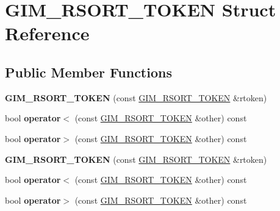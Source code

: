 \hypertarget{structGIM__RSORT__TOKEN}{}\section{G\+I\+M\+\_\+\+R\+S\+O\+R\+T\+\_\+\+T\+O\+K\+EN Struct Reference}
\label{structGIM__RSORT__TOKEN}
\subsection*{Public Member Functions}
\begin{DoxyCompactItemize}
\item 
\mbox{\label{structGIM__RSORT__TOKEN_abf4d93d981f2b19ef0db94f077bf0214}} 
{\bfseries G\+I\+M\+\_\+\+R\+S\+O\+R\+T\+\_\+\+T\+O\+K\+EN} (const \hyperlink{structGIM__RSORT__TOKEN}{G\+I\+M\+\_\+\+R\+S\+O\+R\+T\+\_\+\+T\+O\+K\+EN} \&rtoken)
\item 
\mbox{\label{structGIM__RSORT__TOKEN_a3ef324a42a2b3541eec7aaaa6fc1b4d8}} 
bool {\bfseries operator$<$} (const \hyperlink{structGIM__RSORT__TOKEN}{G\+I\+M\+\_\+\+R\+S\+O\+R\+T\+\_\+\+T\+O\+K\+EN} \&other) const
\item 
\mbox{\label{structGIM__RSORT__TOKEN_ade3cb59d0508d7f882ba8889fc270099}} 
bool {\bfseries operator$>$} (const \hyperlink{structGIM__RSORT__TOKEN}{G\+I\+M\+\_\+\+R\+S\+O\+R\+T\+\_\+\+T\+O\+K\+EN} \&other) const
\item 
\mbox{\label{structGIM__RSORT__TOKEN_abf4d93d981f2b19ef0db94f077bf0214}} 
{\bfseries G\+I\+M\+\_\+\+R\+S\+O\+R\+T\+\_\+\+T\+O\+K\+EN} (const \hyperlink{structGIM__RSORT__TOKEN}{G\+I\+M\+\_\+\+R\+S\+O\+R\+T\+\_\+\+T\+O\+K\+EN} \&rtoken)
\item 
\mbox{\label{structGIM__RSORT__TOKEN_a3ef324a42a2b3541eec7aaaa6fc1b4d8}} 
bool {\bfseries operator$<$} (const \hyperlink{structGIM__RSORT__TOKEN}{G\+I\+M\+\_\+\+R\+S\+O\+R\+T\+\_\+\+T\+O\+K\+EN} \&other) const
\item 
\mbox{\label{structGIM__RSORT__TOKEN_ade3cb59d0508d7f882ba8889fc270099}} 
bool {\bfseries operator$>$} (const \hyperlink{structGIM__RSORT__TOKEN}{G\+I\+M\+\_\+\+R\+S\+O\+R\+T\+\_\+\+T\+O\+K\+EN} \&other) const
\end{DoxyCompactItemize}
